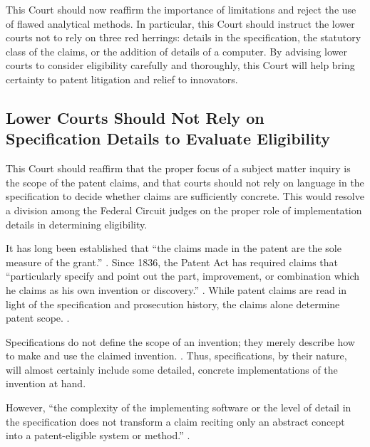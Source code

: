 \documentclass{scotus}
\begin{document}
This Court should now reaffirm the importance of  limitations and
reject the use of flawed analytical methods. In particular, this Court should
instruct the lower courts not to rely on three red herrings: details in the
specification, the statutory class of the claims,
or the addition of details of a computer. By advising lower courts to consider
eligibility carefully and thoroughly, this Court will help bring certainty to
patent litigation and relief to innovators. 


%
%
\subsection{Lower Courts Should Not Rely on
Specification Details to Evaluate Eligibility}

This Court should reaffirm that the proper focus of a  subject
matter inquiry is the scope of the patent claims, and that courts should not
rely on language in the specification to decide whether claims are sufficiently
concrete. This would resolve a division among the Federal Circuit judges on the
proper role of implementation details in determining eligibility.

It has long been established that ``the claims made in the patent are the sole
measure of the grant.''
. Since 1836, the Patent Act has
required claims that
``particularly specify and
point out the part, improvement, or combination which he claims as his own
invention or discovery.'' . %
While patent claims are read in light of the
specification and prosecution history, the claims alone determine
patent scope. .
        
Specifications do not define the scope of an invention; they merely
describe how to make and use the claimed
invention. . Thus, specifications, by their nature,
will almost certainly include some detailed, concrete implementations of the
invention at hand.

However, ``the complexity of the
implementing software or the level of detail in the specification does not
transform a claim reciting only an abstract concept into a patent-eligible
system or method.'' .
\end{document}
